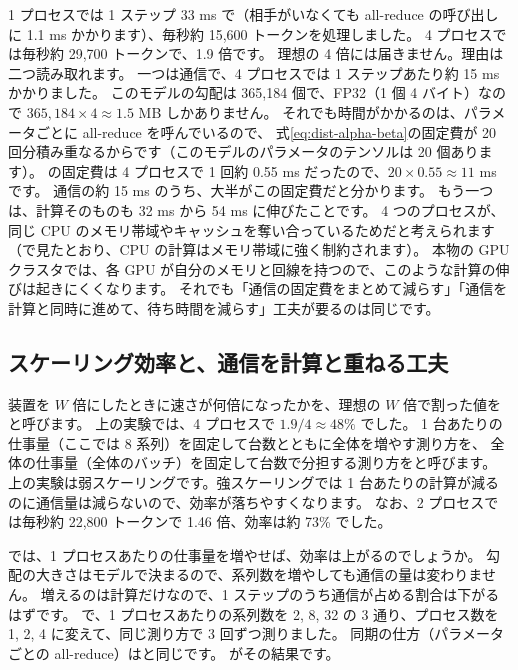 1 プロセスでは 1 ステップ 33 ms で（相手がいなくても all-reduce の呼び出しに 1.1 ms かかります）、毎秒約 15,600 トークンを処理しました。
4 プロセスでは毎秒約 29,700 トークンで、1.9 倍です。
理想の 4 倍には届きません。理由は二つ読み取れます。
一つは通信で、4 プロセスでは 1 ステップあたり約 15 ms かかりました。
このモデルの勾配は 365,184 個で、FP32（1 個 4 バイト）なので $365{,}184\times4\approx1.5$ MB しかありません。
それでも時間がかかるのは、パラメータごとに all-reduce を呼んでいるので、
式\eqref{eq:dist-alpha-beta}の固定費が 20 回分積み重なるからです（このモデルのパラメータのテンソルは 20 個あります）。
の固定費は 4 プロセスで 1 回約 0.55 ms だったので、$20\times0.55\approx11$ ms です。
通信の約 15 ms のうち、大半がこの固定費だと分かります。
もう一つは、計算そのものも 32 ms から 54 ms に伸びたことです。
4 つのプロセスが、同じ CPU のメモリ帯域やキャッシュを奪い合っているためだと考えられます（で見たとおり、CPU の計算はメモリ帯域に強く制約されます）。
本物の GPU クラスタでは、各 GPU が自分のメモリと回線を持つので、このような計算の伸びは起きにくくなります。
それでも「通信の固定費をまとめて減らす」「通信を計算と同時に進めて、待ち時間を減らす」工夫が要るのは同じです。

\subsection*{スケーリング効率と、通信を計算と重ねる工夫}

装置を $W$ 倍にしたときに速さが何倍になったかを、理想の $W$ 倍で割った値をと呼びます。
上の実験では、4 プロセスで $1.9/4\approx 48\%$ でした。
1 台あたりの仕事量（ここでは 8 系列）を固定して台数とともに全体を増やす測り方を、
全体の仕事量（全体のバッチ）を固定して台数で分担する測り方をと呼びます。
上の実験は弱スケーリングです。強スケーリングでは 1 台あたりの計算が減るのに通信量は減らないので、効率が落ちやすくなります。
なお、2 プロセスでは毎秒約 22,800 トークンで 1.46 倍、効率は約 73\% でした。

では、1 プロセスあたりの仕事量を増やせば、効率は上がるのでしょうか。
勾配の大きさはモデルで決まるので、系列数を増やしても通信の量は変わりません。
増えるのは計算だけなので、1 ステップのうち通信が占める割合は下がるはずです。
 で、1 プロセスあたりの系列数を 2, 8, 32 の 3 通り、プロセス数を 1, 2, 4 に変えて、同じ測り方で 3 回ずつ測りました。
同期の仕方（パラメータごとの all-reduce）はと同じです。
がその結果です。

